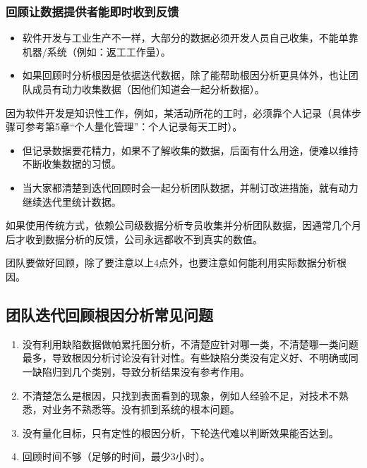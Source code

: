 \hypertarget{ux56deux987eux8ba9ux6570ux636eux63d0ux4f9bux8005ux80fdux5373ux65f6ux6536ux5230ux53cdux9988}{%
\subsubsection{回顾让数据提供者能即时收到反馈}\label{ux56deux987eux8ba9ux6570ux636eux63d0ux4f9bux8005ux80fdux5373ux65f6ux6536ux5230ux53cdux9988}}

\begin{itemize}
\tightlist
\item
  软件开发与工业生产不一样，大部分的数据必须开发人员自己收集，不能单靠机器/系统（例如：返工工作量）。
\item
  如果回顾时分析根因是依据迭代数据，除了能帮助根因分析更具体外，也让团队成员有动力收集数据（因他们知道会一起分析数据）。\\
\end{itemize}

因为软件开发是知识性工作，例如，某活动所花的工时，必须靠个人记录（具体步骤可参考第5章``个人量化管理''：个人记录每天工时）。

\begin{itemize}
\tightlist
\item
  但记录数据要花精力，如果不了解收集的数据，后面有什么用途，便难以维持不断收集数据的习惯。
\item
  当大家都清楚到迭代回顾时会一起分析团队数据，并制订改进措施，就有动力继续迭代里统计数据。\\
\end{itemize}

如果使用传统方式，依赖公司级数据分析专员收集并分析团队数据，因通常几个月后才收到数据分析的反馈，公司永远都收不到真实的数值。

团队要做好回顾，除了要注意以上4点外，也要注意如何能利用实际数据分析根因。

\hypertarget{ux56e2ux961fux8fedux4ee3ux56deux987eux6839ux56e0ux5206ux6790ux5e38ux89c1ux95eeux9898}{%
\subsection{团队迭代回顾根因分析常见问题}\label{ux56e2ux961fux8fedux4ee3ux56deux987eux6839ux56e0ux5206ux6790ux5e38ux89c1ux95eeux9898}}

\begin{enumerate}
\tightlist
\item
  没有利用缺陷数据做帕累托图分析，不清楚应针对哪一类，不清楚哪一类问题最多，导致根因分析讨论没有针对性。有些缺陷分类没有定义好、不明确或同一缺陷归到几个类别，导致分析结果没有参考作用。
\item
  不清楚怎么是根因，只找到表面看到的现象，例如人经验不足，对技术不熟悉，对业务不熟悉等。没有抓到系统的根本问题。
\item
  没有量化目标，只有定性的根因分析，下轮迭代难以判断效果能否达到。
\item
  回顾时间不够（足够的时间，最少3小时）。
\end{enumerate}

